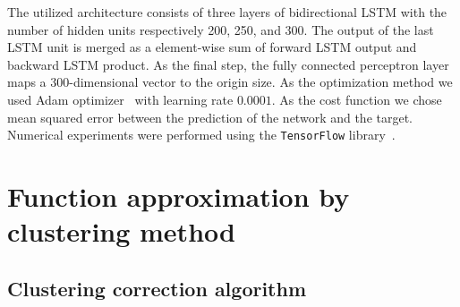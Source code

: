 \documentclass[aps,pra,showkeys,showpacs,notitlepage,superscriptaddress]{revtex4-1}
\newcommand{\1}{{\rm 1\hspace{-0.9mm}l}}
\begin{document}
The utilized architecture consists of three layers of bidirectional LSTM with 
the number of hidden units respectively 200, 250, and 300. The output of the last 
LSTM unit is merged as a element-wise sum of forward LSTM output and backward 
LSTM product. As the final step, the fully connected perceptron layer maps a 300-dimensional vector to the origin size. As the optimization method we used Adam 
optimizer~\cite{kingma2014adam} with learning rate $0.0001$. As the cost 
function we chose mean squared error between the prediction of the network and 
the target. Numerical experiments were 
performed using the \texttt{TensorFlow} 
library~\cite{abadi2016tensorflow,tensorflow}.



\section{Function approximation by clustering method}\label{sec:generation-kmeans}



\subsection{Clustering correction algorithm}
\label{sec:clusterring_corr}
\end{document}
